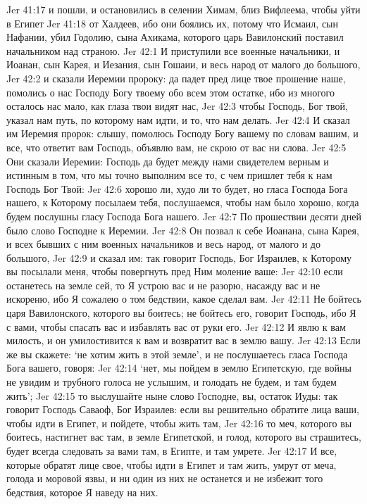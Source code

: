 Jer 41:17  и пошли, и остановились в селении Химам, близ Вифлеема, чтобы уйти в Египет
Jer 41:18  от Халдеев, ибо они боялись их, потому что Исмаил, сын Нафании, убил Годолию, сына Ахикама, которого царь Вавилонский поставил начальником над страною.
Jer 42:1  И приступили все военные начальники, и Иоанан, сын Карея, и Иезания, сын Гошаии, и весь народ от малого до большого,
Jer 42:2  и сказали Иеремии пророку: да падет пред лице твое прошение наше, помолись о нас Господу Богу твоему обо всем этом остатке, ибо из многого осталось нас мало, как глаза твои видят нас,
Jer 42:3  чтобы Господь, Бог твой, указал нам путь, по которому нам идти, и то, что нам делать.
Jer 42:4  И сказал им Иеремия пророк: слышу, помолюсь Господу Богу вашему по словам вашим, и все, что ответит вам Господь, объявлю вам, не скрою от вас ни слова.
Jer 42:5  Они сказали Иеремии: Господь да будет между нами свидетелем верным и истинным в том, что мы точно выполним все то, с чем пришлет тебя к нам Господь Бог Твой:
Jer 42:6  хорошо ли, худо ли то будет, но гласа Господа Бога нашего, к Которому посылаем тебя, послушаемся, чтобы нам было хорошо, когда будем послушны гласу Господа Бога нашего.
Jer 42:7  По прошествии десяти дней было слово Господне к Иеремии.
Jer 42:8  Он позвал к себе Иоанана, сына Карея, и всех бывших с ним военных начальников и весь народ, от малого и до большого,
Jer 42:9  и сказал им: так говорит Господь, Бог Израилев, к Которому вы посылали меня, чтобы повергнуть пред Ним моление ваше:
Jer 42:10  если останетесь на земле сей, то Я устрою вас и не разорю, насажду вас и не искореню, ибо Я сожалею о том бедствии, какое сделал вам.
Jer 42:11  Не бойтесь царя Вавилонского, которого вы боитесь; не бойтесь его, говорит Господь, ибо Я с вами, чтобы спасать вас и избавлять вас от руки его.
Jer 42:12  И явлю к вам милость, и он умилостивится к вам и возвратит вас в землю вашу.
Jer 42:13  Если же вы скажете: `не хотим жить в этой земле', и не послушаетесь гласа Господа Бога вашего, говоря:
Jer 42:14  `нет, мы пойдем в землю Египетскую, где войны не увидим и трубного голоса не услышим, и голодать не будем, и там будем жить';
Jer 42:15  то выслушайте ныне слово Господне, вы, остаток Иуды: так говорит Господь Саваоф, Бог Израилев: если вы решительно обратите лица ваши, чтобы идти в Египет, и пойдете, чтобы жить там,
Jer 42:16  то меч, которого вы боитесь, настигнет вас там, в земле Египетской, и голод, которого вы страшитесь, будет всегда следовать за вами там, в Египте, и там умрете.
Jer 42:17  И все, которые обратят лице свое, чтобы идти в Египет и там жить, умрут от меча, голода и моровой язвы, и ни один из них не останется и не избежит того бедствия, которое Я наведу на них.
